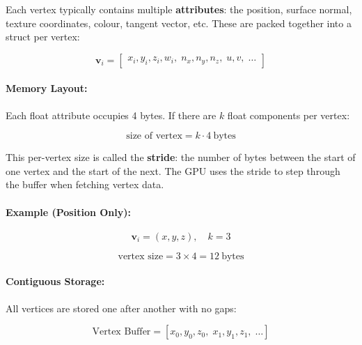 \documentclass[11pt]{article}
\begin{document}
Each vertex typically contains multiple \textbf{attributes}: the position, surface normal, texture coordinates, colour, tangent vector, etc. These are packed together into a struct per vertex:

\begin{equation}
    \mathbf{v}_i =
    \begin{bmatrix}
        x_i, y_i, z_i, w_i, \;
        n_x, n_y, n_z, \;
        u, v, \;
        \dots
    \end{bmatrix}
\end{equation}

\paragraph{Memory Layout:}

Each float attribute occupies 4 bytes. If there are $k$ float components per vertex:

\begin{equation}
    \text{size of vertex} = k \cdot 4\ \text{bytes}
\end{equation}

This per-vertex size is called the \textbf{stride}: the number of bytes between the start of one vertex and the start of the next. The GPU uses the stride to step through the buffer when fetching vertex data.

\paragraph{Example (Position Only):}

\begin{equation}
    \mathbf{v}_i = (x, y, z), \quad k = 3
\end{equation}

\begin{equation}
    \text{vertex size} = 3 \times 4 = 12\ \text{bytes}
\end{equation}

\paragraph{Contiguous Storage:}

All vertices are stored one after another with no gaps:

\begin{equation}
    \text{Vertex Buffer} =
    [x_0, y_0, z_0, \; x_1, y_1, z_1, \; \dots]
\end{equation}
\end{document}
